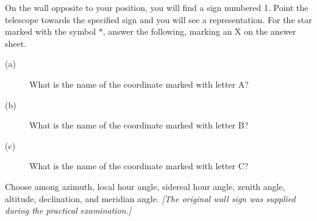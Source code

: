 On the wall opposite to your position, you will find a sign numbered 1. Point the telescope towards the specified sign and you will see a representation. For the star marked with the symbol $*$, answer the following, marking an X on the answer sheet.
\begin{description}
\item[(a)] What is the name of the coordinate marked with letter A?
\item[(b)] What is the name of the coordinate marked with letter B?
\item[(c)] What is the name of the coordinate marked with letter C?
\end{description}
Choose among azimuth, local hour angle, sidereal hour angle, zenith angle, altitude, declination, and meridian angle.
\textit{[The original wall sign was supplied during the practical examination.]}
